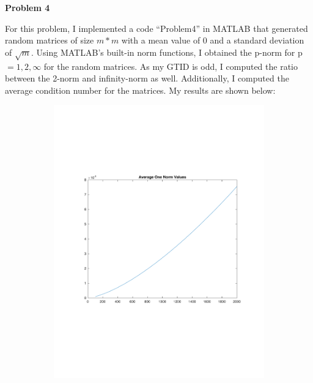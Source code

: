 \documentclass{article}
\newcommand{\Problem}[1]{\textbf{Problem #1}}
\begin{document}
\Problem{4}

For this problem, I implemented a code ``Problem4'' in MATLAB that generated random matrices of size $m*m$ with a mean value of $0$ and a standard deviation of $\sqrt{m}$. 
Using MATLAB's built-in norm functions, I obtained the p-norm for p$=1,2,\infty$ for the random matrices. 
As my GTID is odd, I computed the ratio between the 2-norm and infinity-norm as well. 
Additionally, I computed the average condition number for the matrices.
My results are shown below:

\begin{figure}[H] %
\begin{subfigure}{0.48\textwidth}
\includegraphics[width=\linewidth]{one}
\end{subfigure}\hspace*{\fill}
\begin{subfigure}{0.48\textwidth}

\end{subfigure}
\end{figure}
\end{document}
